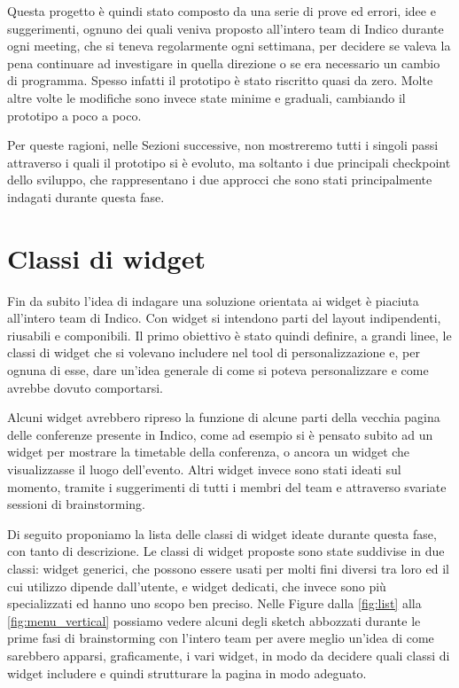             Questa progetto è quindi stato composto da una serie di prove ed errori, idee e suggerimenti, ognuno dei quali veniva proposto all'intero team di Indico durante ogni meeting, che si teneva regolarmente ogni settimana, per decidere se valeva la pena continuare ad investigare in quella direzione o se era necessario un cambio di programma. Spesso infatti il prototipo è stato riscritto quasi da zero. Molte altre volte le modifiche sono invece state minime e graduali, cambiando il prototipo a poco a poco.
            
            Per queste ragioni, nelle Sezioni successive, non mostreremo tutti i singoli passi attraverso i quali il prototipo si è evoluto, ma soltanto i due principali checkpoint dello sviluppo, che rappresentano i due approcci che sono stati principalmente indagati durante questa fase.
            
    \section{Classi di widget} \label{sec:ccp;classi_widget}
    
        Fin da subito l'idea di indagare una soluzione orientata ai widget è piaciuta all'intero team di Indico. Con widget si intendono parti del layout indipendenti, riusabili e componibili. Il primo obiettivo è stato quindi definire, a grandi linee, le classi di widget che si volevano includere nel tool di personalizzazione e, per ognuna di esse, dare un'idea generale di come si poteva personalizzare e come avrebbe dovuto comportarsi.
        
        Alcuni widget avrebbero ripreso la funzione di alcune parti della vecchia pagina delle conferenze presente in Indico, come ad esempio si è pensato subito ad un widget per mostrare la timetable della conferenza, o ancora un widget che visualizzasse il luogo dell'evento. Altri widget invece sono stati ideati sul momento, tramite i suggerimenti di tutti i membri del team e attraverso svariate sessioni di brainstorming.
        
        Di seguito proponiamo la lista delle classi di widget ideate durante questa fase, con tanto di descrizione. Le classi di widget proposte sono state suddivise in due classi: widget generici, che possono essere usati per molti fini diversi tra loro ed il cui utilizzo dipende dall'utente, e widget dedicati, che invece sono più specializzati ed hanno uno scopo ben preciso. Nelle Figure dalla \ref{fig:list} alla \ref{fig:menu_vertical} possiamo vedere alcuni degli sketch abbozzati durante le prime fasi di brainstorming con l'intero team per avere meglio un'idea di come sarebbero apparsi, graficamente, i vari widget, in modo da decidere quali classi di widget includere e quindi strutturare la pagina in modo adeguato.
        
